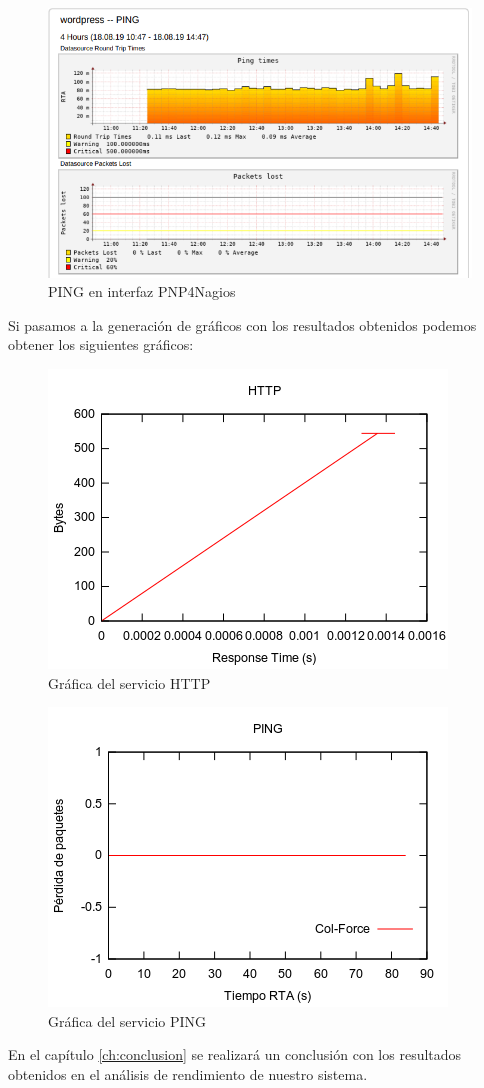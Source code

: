 \begin{figure}[H]
	\centering
	\includegraphics[scale=0.5]{imagenes/modelado/ping.png}
	\caption{PING en interfaz PNP4Nagios} \label{pingpnp4nagios}
\end{figure}
\newpage
Si pasamos a la generación de gráficos con los resultados obtenidos podemos obtener los siguientes gráficos:
\begin{figure}[H]
	\centering
	\includegraphics[scale=0.7]{valores_obtenidos/HTTP.png}
	\caption{Gráfica del servicio HTTP} \label{grafica_http}
\end{figure}
\begin{figure}[H]
	\centering
	\includegraphics[scale=0.7]{valores_obtenidos/PING.png}
	\caption{Gráfica del servicio PING} \label{grafica_ping}
\end{figure}
En el capítulo \ref{ch:conclusion} se realizará un conclusión con los resultados obtenidos en el análisis de rendimiento de nuestro sistema.
\newpage